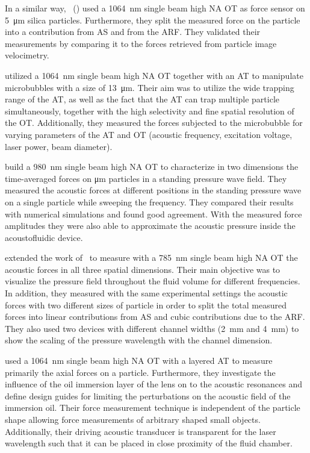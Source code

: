 In a similar way, ~(\citeyear{Bassindale2014}) used a 
\SI{1064}{\nm} single beam high NA OT as force sensor on \SI{5}{\um} silica 
particles. Furthermore, they split the measured force on the particle into a 
contribution from AS and from the ARF. They validated their measurements by 
comparing it to the forces retrieved from particle image velocimetry.

 utilized a \SI{1064}{\nm} single beam high NA OT together with 
an AT to manipulate microbubbles with a size of \SI{13}{\um}. Their aim was to 
utilize the wide trapping range of the AT, as well as the fact that the AT can 
trap multiple particle simultaneously, together with the high selectivity and 
fine spatial resolution of the OT. Additionally, they measured the forces 
subjected to the microbubble for varying parameters of the AT and OT (acoustic 
frequency, excitation voltage, laser power, beam diameter).

 build a \SI{980}{\nm} single beam high NA OT to 
characterize in two dimensions the time-averaged forces on \si{\um} particles 
in a standing pressure wave field. They measured the acoustic forces at 
different positions in the standing pressure wave on a single particle while 
sweeping the frequency. They compared their results with numerical simulations 
and found good agreement. With the measured force amplitudes they were also 
able to approximate the acoustic pressure inside the acoustofluidic device.

 extended the work of~\cite{Lakaemper2015} to measure with 
a \SI{785}{\nm} single beam high NA OT the acoustic forces in all three spatial 
dimensions. Their main objective was to visualize the pressure field throughout 
the fluid volume for different frequencies. In addition, they measured with the 
same experimental settings the acoustic forces with two different sizes of 
particle in order to split the total measured forces into linear contributions 
from AS and cubic contributions due to the ARF. They also used two devices with 
different channel widths (\SI{2}{\mm} and \SI{4}{\mm}) to show the scaling of 
the pressure wavelength with the channel dimension.

 used a \SI{1064}{\nm} single beam high NA OT with a 
layered AT to measure primarily the axial forces on a particle. Furthermore, 
they investigate the influence of the oil immersion layer of the lens on to the 
acoustic resonances and define design guides for limiting the perturbations on 
the acoustic field of the immersion oil. Their force measurement technique is 
independent of the particle shape allowing force measurements of arbitrary 
shaped small objects. Additionally, their driving acoustic transducer is 
transparent for the laser wavelength such that it can be placed in close 
proximity of the fluid chamber.


